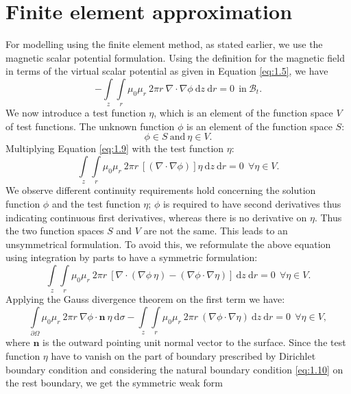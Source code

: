 \section{Finite element approximation}
For modelling using the finite element method, as stated earlier, we use the magnetic scalar potential formulation. Using the definition for the magnetic field in terms of the virtual scalar potential as given in Equation \eqref{eq:1.5}, we have
\begin{equation}
-\int\limits_{z} \int\limits_{r} \mu_0 \mu_r \ 2 \pi r \ \nabla \cdot \nabla \phi \ \mathrm{d}z \ \mathrm{d}r = 0 \ \ \text{in} \ \mathcal{B}_t.
\label{eq:1.9}
\end{equation}
We now introduce a test function $\eta$, which is an element of the function space $V$ of test functions. The unknown function $\phi$ is an element of the function space $S$:
\begin{equation}
\phi \in S \ \text{and} \ \eta \in V.
\end{equation}
Multiplying Equation \eqref{eq:1.9} with the test function $\eta$:
\begin{equation}
\int\limits_{z} \int\limits_{r} \mu_0 \mu_r \ 2 \pi r \ [(\nabla \cdot \nabla \phi)] \eta \ \mathrm{d}z \ \mathrm{d}r = 0 \ \ \forall \eta \in V.
\end{equation}
We observe different continuity requirements hold concerning the solution function $\phi$ and the test function $\eta$; $\phi$ is required to have second derivatives thus indicating continuous first derivatives, whereas there is no derivative on $\eta$. Thus the two function spaces $S$ and $V$ are not the same. This leads to an unsymmetrical formulation. To avoid this, we reformulate the above equation using integration by parts to have a symmetric formulation:
\begin{equation}
\int\limits_{z} \int\limits_{r} \mu_0 \mu_r \ 2 \pi r \ [ \nabla \cdot (\nabla\phi \ \eta) - (\nabla \phi \cdot \nabla \eta) ] \ \mathrm{d}z \ \mathrm{d}r = 0 \ \ \forall \eta \in V.
\end{equation}
Applying the Gauss divergence theorem on the first term we have:
\begin{equation}
\int\limits_{\partial \Omega} \mu_0 \mu_r \ 2 \pi r \ \nabla \phi \cdot \mathbf{n} \ \eta \ \mathrm{d}\sigma - \int\limits_{z} \int\limits_{r} \mu_0 \mu_r \ 2 \pi r \ (\nabla \phi \cdot \nabla \eta) \ \mathrm{d}z \ \mathrm{d}r = 0 \ \ \forall \eta \in V,
\end{equation}
where $\mathbf{n}$ is the outward pointing unit normal vector to the surface. Since the test function $\eta$ have to vanish on the part of boundary prescribed by Dirichlet boundary condition and considering the natural boundary condition \eqref{eq:1.10} on the rest boundary, we get the symmetric weak form
